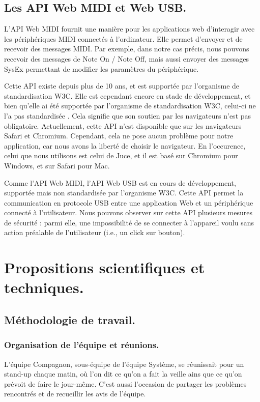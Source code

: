 \documentclass[francais]{rapportPFE}  %
\begin{document}
\subsection{Les API Web MIDI et Web USB.}

L'API Web MIDI \cite{webmidi1}
fournit une manière pour les applications web d'interagir avec les périphériques MIDI connectés à l'ordinateur. Elle permet d'envoyer et de recevoir des messages MIDI. Par exemple, dans notre cas précis, nous pouvons recevoir des messages de Note On / Note Off, mais aussi envoyer des messages SysEx permettant de modifier les paramètres du périphérique.

Cette API existe depuis plus de 10 ans, et est supportée par l'organisme de standardisation W3C. Elle est cependant encore en stade de développement, et bien qu'elle ai été supportée par l'organisme de standardisation W3C, celui-ci ne l'a pas standardisée \cite{webmidi2}. Cela signifie que son soutien par les navigateurs n'est pas obligatoire. Actuellement, cette API n'est disponible que sur les navigateurs Safari et Chromium. Cependant, cela ne pose aucun problème pour notre application, car nous avons la liberté de choisir le navigateur. En l'occurence, celui que nous utilisons est celui de Juce, et il est basé sur Chromium pour Windows, et sur Safari pour Mac.

Comme l'API Web MIDI, l'API Web USB \cite{webusb1}
est en cours de développement, supportée mais non standardisée par l'organisme W3C. Cette API permet la communication en protocole USB entre une application Web et un périphérique connecté à l'utilisateur.
Nous pouvons observer sur cette API plusieurs mesures de sécurité \cite{webusb2}
 : parmi elle, une impossibilité de se connecter à l'appareil voulu sans action préalable de l'utilisateur (i.e., un click sur bouton).


\section{Propositions scientifiques et techniques.}
\subsection{Méthodologie de travail.}
\subsubsection{Organisation de l'équipe et réunions.}
L'équipe Compagnon, sous-équipe de l'équipe Système, se réunissait pour un stand-up chaque matin, où l'on dit ce qu'on a fait la veille ains que ce qu'on prévoit de faire le jour-même. C'est aussi l'occasion de partager les problèmes rencontrés et de recueillir les avis de l'équipe.
\end{document}
